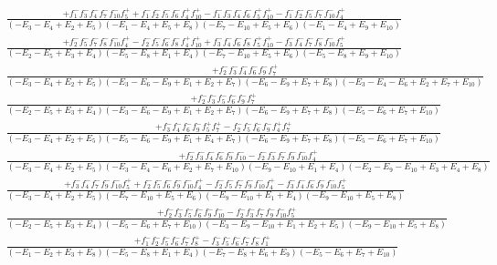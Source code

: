 \documentclass{article}
\begin{document}
\[\begin{array}{rcl}
\frac{+f_{1}^{-}f_{3}^{-}f_{4}^{-}f_{7}^{-}f_{10}^{-}f_{5}^{+}+f_{1}^{-}f_{2}^{-}f_{5}^{-}f_{6}^{-}f_{4}^{+}f_{10}^{+}-f_{1}^{-}f_{3}^{-}f_{4}^{-}f_{6}^{-}f_{5}^{+}f_{10}^{+}-f_{1}^{-}f_{2}^{-}f_{5}^{-}f_{7}^{-}f_{10}^{-}f_{4}^{+}}{(-E_{3}-E_{4}+E_{2}+E_{5})(-E_{1}-E_{4}+E_{5}+E_{8})(-E_{7}-E_{10}+E_{5}+E_{6})(-E_{1}-E_{4}+E_{9}+E_{10})}\\
\frac{+f_{2}^{-}f_{5}^{-}f_{7}^{-}f_{8}^{-}f_{10}^{-}f_{4}^{+}-f_{2}^{-}f_{5}^{-}f_{6}^{-}f_{8}^{-}f_{4}^{+}f_{10}^{+}+f_{3}^{-}f_{4}^{-}f_{6}^{-}f_{8}^{-}f_{5}^{+}f_{10}^{+}-f_{3}^{-}f_{4}^{-}f_{7}^{-}f_{8}^{-}f_{10}^{-}f_{5}^{+}}{(-E_{2}-E_{5}+E_{3}+E_{4})(-E_{5}-E_{8}+E_{1}+E_{4})(-E_{7}-E_{10}+E_{5}+E_{6})(-E_{5}-E_{8}+E_{9}+E_{10})}\\
\frac{+f_{2}^{-}f_{3}^{-}f_{4}^{-}f_{6}^{-}f_{9}^{-}f_{7}^{+}}{(-E_{3}-E_{4}+E_{2}+E_{5})(-E_{3}-E_{6}-E_{9}+E_{1}+E_{2}+E_{7})(-E_{6}-E_{9}+E_{7}+E_{8})(-E_{3}-E_{4}-E_{6}+E_{2}+E_{7}+E_{10})}\\
\frac{+f_{2}^{-}f_{3}^{-}f_{5}^{-}f_{6}^{-}f_{9}^{-}f_{7}^{+}}{(-E_{2}-E_{5}+E_{3}+E_{4})(-E_{3}-E_{6}-E_{9}+E_{1}+E_{2}+E_{7})(-E_{6}-E_{9}+E_{7}+E_{8})(-E_{5}-E_{6}+E_{7}+E_{10})}\\
\frac{+f_{3}^{-}f_{4}^{-}f_{6}^{-}f_{9}^{-}f_{5}^{+}f_{7}^{+}-f_{2}^{-}f_{5}^{-}f_{6}^{-}f_{9}^{-}f_{4}^{+}f_{7}^{+}}{(-E_{3}-E_{4}+E_{2}+E_{5})(-E_{5}-E_{6}-E_{9}+E_{1}+E_{4}+E_{7})(-E_{6}-E_{9}+E_{7}+E_{8})(-E_{5}-E_{6}+E_{7}+E_{10})}\\
\frac{+f_{2}^{-}f_{3}^{-}f_{4}^{-}f_{6}^{-}f_{9}^{-}f_{10}^{-}-f_{2}^{-}f_{3}^{-}f_{7}^{-}f_{9}^{-}f_{10}^{-}f_{4}^{+}}{(-E_{3}-E_{4}+E_{2}+E_{5})(-E_{3}-E_{4}-E_{6}+E_{2}+E_{7}+E_{10})(-E_{9}-E_{10}+E_{1}+E_{4})(-E_{2}-E_{9}-E_{10}+E_{3}+E_{4}+E_{8})}\\
\frac{+f_{3}^{-}f_{4}^{-}f_{7}^{-}f_{9}^{-}f_{10}^{-}f_{5}^{+}+f_{2}^{-}f_{5}^{-}f_{6}^{-}f_{9}^{-}f_{10}^{-}f_{4}^{+}-f_{2}^{-}f_{5}^{-}f_{7}^{-}f_{9}^{-}f_{10}^{-}f_{4}^{+}-f_{3}^{-}f_{4}^{-}f_{6}^{-}f_{9}^{-}f_{10}^{-}f_{5}^{+}}{(-E_{3}-E_{4}+E_{2}+E_{5})(-E_{7}-E_{10}+E_{5}+E_{6})(-E_{9}-E_{10}+E_{1}+E_{4})(-E_{9}-E_{10}+E_{5}+E_{8})}\\
\frac{+f_{2}^{-}f_{3}^{-}f_{5}^{-}f_{6}^{-}f_{9}^{-}f_{10}^{-}-f_{2}^{-}f_{3}^{-}f_{7}^{-}f_{9}^{-}f_{10}^{-}f_{5}^{+}}{(-E_{2}-E_{5}+E_{3}+E_{4})(-E_{5}-E_{6}+E_{7}+E_{10})(-E_{3}-E_{9}-E_{10}+E_{1}+E_{2}+E_{5})(-E_{9}-E_{10}+E_{5}+E_{8})}\\
\frac{+f_{1}^{-}f_{2}^{-}f_{5}^{-}f_{6}^{-}f_{7}^{-}f_{8}^{+}-f_{3}^{-}f_{5}^{-}f_{6}^{-}f_{7}^{-}f_{8}^{-}f_{1}^{+}}{(-E_{1}-E_{2}+E_{3}+E_{8})(-E_{5}-E_{8}+E_{1}+E_{4})(-E_{7}-E_{8}+E_{6}+E_{9})(-E_{5}-E_{6}+E_{7}+E_{10})}\\

\end{array}\]
\end{document}
